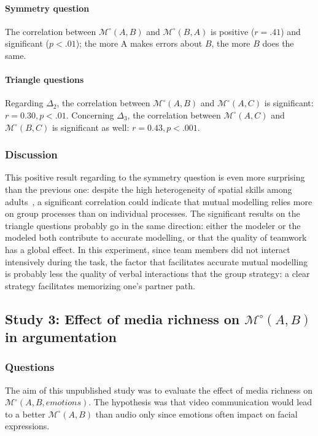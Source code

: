 \documentclass[twocolumn]{article}
\newcommand{\Model}[3]{{$\mathcal{M}^{\circ}(#1, #2, #3)$}}
\newcommand{\gModel}[2]{{$\mathcal{M}^{\circ}(#1, #2)$}}
\begin{document}
\paragraph{Symmetry question} The correlation between \gModel{A}{B}  and
\gModel{B}{A}  is positive ($r = .41$) and significant ($p < .01$);  the more A
makes errors about $B$, the more $B$ does the same.

\paragraph{Triangle questions} Regarding $\Delta_2$, the correlation between
\gModel{A}{B} and \gModel{A}{C} is significant: $r=0.30, p <.01$. Concerning
$\Delta_3$, the correlation between \gModel{A}{C} and \gModel{B}{C} is
significant as well: $r=0.43, p <.001$.

\subsubsection*{Discussion}

This positive result regarding to the symmetry question is even more surprising
than the previous one: despite the high heterogeneity of spatial skills among
adults~\citep{liben1981spatial}, a significant correlation could indicate that
mutual modelling relies more on group processes than on individual processes. The
significant results on the triangle questions probably go in the same direction:
either the modeler or the modeled both contribute to accurate modelling, or that
the quality of teamwork has a global effect. In this experiment, since team
members did not interact intensively during the task, the factor that
facilitates accurate mutual modelling is probably less the quality of verbal
interactions that the group strategy: a clear strategy facilitates memorizing
one's partner path. 




\subsection{Study 3:  Effect of media richness on \gModel{A}{B} in argumentation}

\subsubsection*{Questions}

The aim of this unpublished study was to evaluate the effect of media richness
on \Model{A}{B}{emotions}. The hypothesis was that video communication would
lead to a better \gModel{A}{B} than audio only since emotions often impact on
facial expressions.
\end{document}
